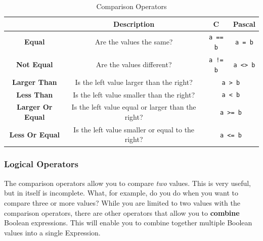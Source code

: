 \begin{table}[h]
  \centering
  \begin{tabular}{|c|c|c|c|}
    \hline
     & \textbf{Description} & \textbf{C} & \textbf{Pascal} \\
    \hline
    \textbf{Equal} & Are the values the same? & \texttt{a == b} & \texttt{a = b} \\
    \hline
    \textbf{Not Equal} & Are the values different? & \texttt{a != b} & \texttt{a <> b} \\
    \hline
    \textbf{Larger Than} & Is the left value larger than the right? & \multicolumn{2}{c|}{\texttt{a > b}}  \\
    \hline
    \textbf{Less Than} & Is the left value smaller than the right? & \multicolumn{2}{c|}{\texttt{a < b}}  \\
    \hline
    \textbf{Larger Or Equal} & Is the left value equal or larger than the right? & \multicolumn{2}{c|}{\texttt{a >= b}}  \\
    \hline
    \textbf{Less Or Equal} & Is the left value smaller or equal to the right? & \multicolumn{2}{c|}{\texttt{a <= b}}  \\
    \hline
    
  \end{tabular}
  \caption{Comparison Operators}
  \label{tbl:comparisons}
\end{table}




\clearpage
\subsubsection{Logical Operators} %
\label{sub:logical_operators}

The comparison operators allow you to compare \emph{two} values. This is very useful, but in itself is incomplete. What, for example, do you do when you want to compare three or more values? While you are limited to two values with the comparison operators, there are other operators that allow you to \textbf{combine} Boolean expressions. This will enable you to combine together multiple Boolean values into a single Expression.

